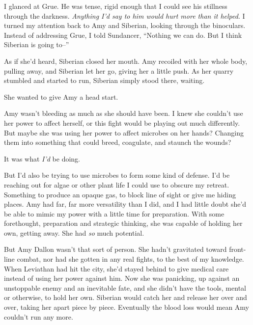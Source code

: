I glanced at Grue.  He was tense, rigid enough that I could see his stillness through the darkness.  \emph{Anything I'd say to him would hurt more than it helped}.  I turned my attention back to Amy and Siberian, looking through the binoculars.  Instead of addressing Grue, I told Sundancer, ``Nothing we can do.  But I think Siberian is going to--''



As if she'd heard, Siberian closed her mouth.  Amy recoiled with her whole body, pulling away, and Siberian let her go, giving her a little push.  As her quarry stumbled and started to run, Siberian simply stood there, waiting.



She wanted to give Amy a head start.



Amy wasn't bleeding as much as she should have been.  I knew she couldn't use her power to affect herself, or this fight would be playing out much differently.  But maybe she was using her power to affect microbes on her hands?  Changing them into something that could breed, coagulate, and staunch the wounds?



It was what \emph{I'd} be doing.



But I'd also be trying to use microbes to form some kind of defense.  I'd be reaching out for algae or other plant life I could use to obscure my retreat.  Something to produce an opaque gas, to block line of sight or give me hiding places.  Amy had far, far more versatility than I did, and I had little doubt she'd be able to mimic my power with a little time for preparation.  With some forethought, preparation and strategic thinking, she was capable of holding her own, getting away.  She had \emph{so} much potential.



But Amy Dallon wasn't that sort of person.  She hadn't gravitated toward front-line combat, nor had she gotten in any real fights, to the best of my knowledge.  When Leviathan had hit the city, she'd stayed behind to give medical care instead of using her power against him.  Now she was panicking, up against an unstoppable enemy and an inevitable fate, and she didn't have the tools, mental or otherwise, to hold her own.  Siberian would catch her and release her over and over, taking her apart piece by piece.  Eventually the blood loss would mean Amy couldn't run any more.



